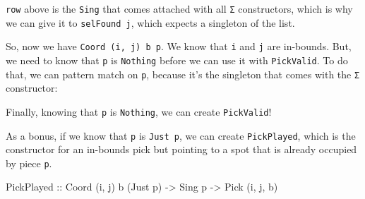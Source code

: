 \documentclass[]{article}
\newenvironment{Shaded}{}{}
\newcommand{\CommentTok}[1]{\textcolor[rgb]{0.38,0.63,0.69}{\textit{#1}}}
\newcommand{\DataTypeTok}[1]{\textcolor[rgb]{0.56,0.13,0.00}{#1}}
\newcommand{\KeywordTok}[1]{\textcolor[rgb]{0.00,0.44,0.13}{\textbf{#1}}}
\newcommand{\NormalTok}[1]{#1}
\newcommand{\OperatorTok}[1]{\textcolor[rgb]{0.40,0.40,0.40}{#1}}
\newcommand{\OtherTok}[1]{\textcolor[rgb]{0.00,0.44,0.13}{#1}}
\begin{document}
\texttt{row} above is the \texttt{Sing} that comes attached with all \texttt{Σ}
constructors, which is why we can give it to \texttt{selFound\ j}, which expects
a singleton of the list.

So, now we have \texttt{Coord\ \textquotesingle{}(i,\ j)\ b\ p}. We know that
\texttt{i} and \texttt{j} are in-bounds. But, we need to know that \texttt{p} is
\texttt{\textquotesingle{}Nothing} before we can use it with \texttt{PickValid}.
To do that, we can pattern match on \texttt{p}, because it's the singleton that
comes with the \texttt{Σ} constructor:

\begin{Shaded}
\end{Shaded}

Finally, knowing that \texttt{p} is \texttt{\textquotesingle{}Nothing}, we can
create \texttt{PickValid}!

As a bonus, if we know that \texttt{p} is \texttt{\textquotesingle{}Just\ p}, we
can create \texttt{PickPlayed}, which is the constructor for an in-bounds pick
but pointing to a spot that is already occupied by piece
\texttt{p\textquotesingle{}}.

\begin{Shaded}
\begin{Highlighting}[]
\DataTypeTok{PickPlayed}\OtherTok{ ::} \DataTypeTok{Coord}\NormalTok{ \textquotesingle{}(i, j) b (}\DataTypeTok{\textquotesingle{}Just}\NormalTok{ p)}
           \OtherTok{{-}>} \DataTypeTok{Sing}\NormalTok{ p}
           \OtherTok{{-}>} \DataTypeTok{Pick}\NormalTok{ \textquotesingle{}(i, j, b)}
\end{Highlighting}
\end{Shaded}
\end{document}
